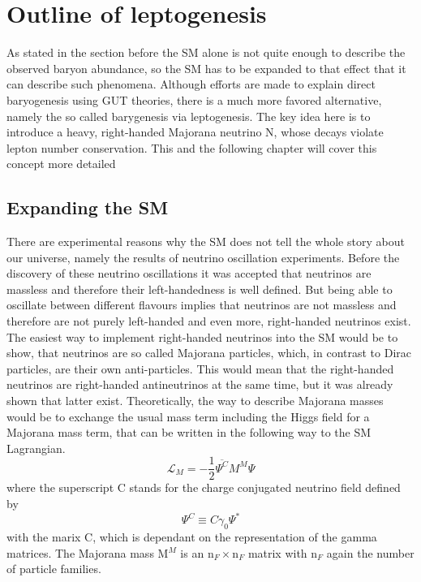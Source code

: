 \chapter{Outline of leptogenesis}
As stated in the section before the SM alone is not quite enough to describe the observed baryon abundance, so the SM has to be expanded to that effect that it can describe such phenomena. \newline
Although efforts are made to explain direct baryogenesis using GUT theories, there is a much more favored alternative, namely the so called barygenesis via leptogenesis. The key idea here is to introduce a heavy, right-handed Majorana neutrino N, whose decays violate lepton number conservation. \newline
This and the following chapter will cover this concept more detailed
\section{Expanding the SM}
There are experimental reasons why the SM does not tell the whole story about our universe, namely the results of neutrino oscillation experiments. Before the discovery of these neutrino oscillations it was accepted that neutrinos are massless and therefore their left-handedness is well defined. But being able to oscillate between different flavours implies that neutrinos are not massless and therefore are not purely left-handed and even more, right-handed neutrinos exist. The easiest way to implement right-handed neutrinos into the SM would be to show, that neutrinos are so called Majorana particles, which, in contrast to Dirac particles, are their own anti-particles. This would mean that the right-handed neutrinos are right-handed antineutrinos at the same time, but it was already shown that latter exist. Theoretically, the way to describe Majorana masses would be to exchange the usual mass term including the Higgs field for a Majorana mass term, that can be written in the following way \cite[p. 18]{Taanila:2008} to the SM Lagrangian.
\begin{equation*}
	\mathcal{L}_M=-\frac{1}{2}\overline{\Psi^C}M^M\Psi
	\label{eq:majorana}
\end{equation*}
where the superscript C stands for the charge conjugated neutrino field defined by
\begin{equation*}
	\Psi^C\equiv C\gamma_0\Psi^*
\end{equation*}
with the marix C, which is dependant on the representation of the gamma matrices. The Majorana mass M$^M$ is an n$_F\times$n$_F$ matrix with n$_F$ again the number of particle families. \newline
